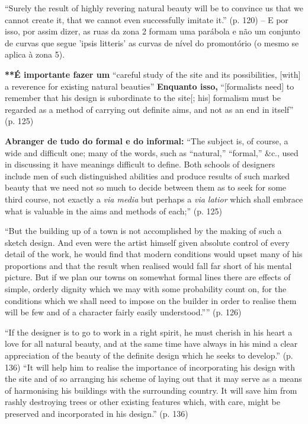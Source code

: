 \documentclass[12pt, a4paper]{book} %
\begin{document}
        ``Surely the result of highly revering natural beauty will be to convince us that we cannot create it, that we cannot even successfully imitate it.'' (p. 120) – E por isso, por assim dizer, as ruas da zona 2 formam uma parábola e não um conjunto de curvas que segue 'ipsis litteris' as curvas de nível do promontório (o mesmo se aplica à zona 5).

        \textbf{**É importante fazer um} ``careful study of the site and its possibilities, [with] a reverence for existing natural beauties''
        \textbf{Enquanto isso,} ``[formalists need] to remember that his design is subordinate to the site[; his] formalism must be regarded as a method of carrying out definite aims, and not as an end in itself'' (p. 125)

        \textbf{Abranger de tudo do formal e do informal:} ``The subject is, of course, a wide and difficult one; many of the words, such as “natural,” “formal,” &c., used in discussing it have meanings difficult to define. Both schools of designers include men of such distinguished abilities and produce results of such marked beauty that we need not so much to decide between them as to seek for some third course, not exactly a \textit{via media} but perhaps a \textit{via latior} which shall embrace what is valuable in the aims and methods of each;'' (p. 125)

        ``But the building up of a town is not accomplished by the making of such a sketch design. And even were the artist himself given absolute control of every detail of the work, he would find that modern conditions would upset many of his proportions and that the result when realised would fall far short of his mental picture. But if we plan our towns on somewhat formal lines there are effects of simple, orderly dignity which we may with some probability count on, for the conditions which we shall need to impose on the builder in order to realise them will be few and of a character fairly easily understood.'''' (p. 126)

        ``If the designer is to go to work in a right spirit, he must cherish in his heart a love for all natural beauty, and at the same time have always in his mind a clear appreciation of the beauty of the definite design which he seeks to develop.'' (p. 136)
        ``It will help him to realise the importance of incorporating his design with the site and of so arranging his scheme of laying out that it may serve as a means of harmonising his buildings with the surrounding country. It will save him from rashly destroying trees or other existing features which, with care, might be preserved and incorporated in his design.'' (p. 136)
\end{document}
